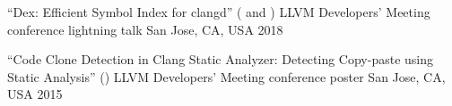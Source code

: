 
\begin{cventries}

  \cventry
    {``Dex: Efficient Symbol Index for clangd''
     ( and
      )}
    {LLVM Developers' Meeting conference lightning talk}
    {San Jose, CA, USA}
    {2018}
    {}

  \cventry
    {``Code Clone Detection in Clang Static Analyzer: Detecting Copy-paste using
     Static Analysis''
     ()}
    {LLVM Developers' Meeting conference poster}
    {San Jose, CA, USA}
    {2015}
    {}

\end{cventries}
